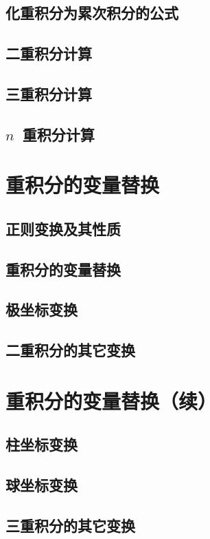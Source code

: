 \subsection{化重积分为累次积分的公式}
\subsection{二重积分计算}
\subsection{三重积分计算}
\subsection{$n$~重积分计算}
\begin{exercise}

\end{exercise}
\section{重积分的变量替换}
\subsection{正则变换及其性质}
\subsection{重积分的变量替换}
\subsection{极坐标变换}
\subsection{二重积分的其它变换}
\begin{exercise}

\end{exercise}
\section{重积分的变量替换（续）}
\subsection{柱坐标变换}
\subsection{球坐标变换}
\subsection{三重积分的其它变换}
